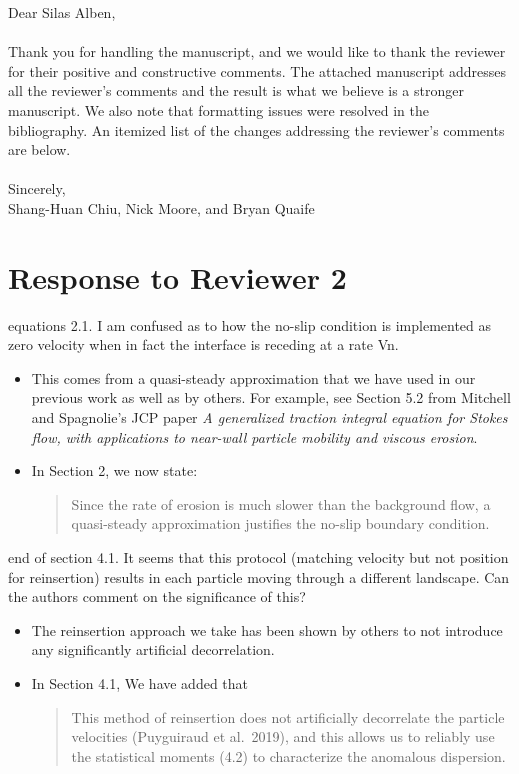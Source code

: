 \documentclass[11pt]{article}
\newcommand{\comment}[1]{{\color{blue} #1}}
\begin{document}
\noindent
Dear Silas Alben,
\\ \\
\noindent
Thank you for handling the manuscript, and we would like to thank the
reviewer for their positive and constructive comments.  The attached
manuscript addresses all the reviewer's comments and the result is what
we believe is a stronger manuscript.  We also note that formatting
issues were resolved in the bibliography. An itemized list of the
changes addressing the reviewer's comments are below.
\\ \\
\noindent
Sincerely,
\\
\noindent
Shang-Huan Chiu, Nick Moore, and Bryan Quaife

\section*{Response to Reviewer 2}

\noindent
\comment{equations 2.1.  I am confused as to how the no-slip condition
is implemented as zero velocity when in fact the interface is receding
at a rate Vn.}
\begin{itemize}
  \item This comes from a quasi-steady approximation that we have used
    in our previous work as well as by others. For example, see Section
    5.2 from Mitchell and Spagnolie's JCP paper {\em A generalized
    traction integral equation for Stokes flow, with applications to
    near-wall particle mobility and viscous erosion}.

  \item In Section 2, we now state:
    \begin{quotation}
      \noindent
      Since the rate of erosion is much slower than the background flow,
      a quasi-steady approximation justifies the no-slip boundary
      condition.
    \end{quotation}
\end{itemize}

\noindent
\comment{end of section 4.1.  It seems that this protocol (matching
velocity but not position for reinsertion) results in each particle
moving through a different landscape.  Can the authors comment on the
significance of this?}
\begin{itemize}
  \item The reinsertion approach we take has been shown by others to not
    introduce any significantly artificial decorrelation.

  \item In Section 4.1, We have added that
    \begin{quotation}
      \noindent
      This method of reinsertion does not artificially decorrelate the
      particle velocities (Puyguiraud et al.~2019), and this allows us
      to reliably use the statistical moments (4.2) to characterize the
      anomalous dispersion.
    \end{quotation}

\end{itemize}
\end{document}
